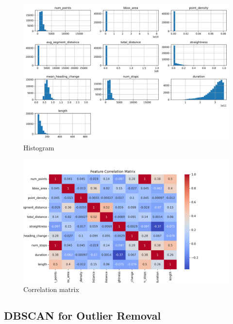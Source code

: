 \documentclass[a4paper,12pt,twoside]{scrreprt}
\begin{document}
\begin{figure}[htbp]
  \centering

  \includegraphics[width=1\textwidth]{Figures/histogram_feature_data_pre_clustering.png}
  \caption{Histogram}
  \label{fig:histogram-feature-engineered-data}
\end{figure}
\FloatBarrier

\begin{figure}[htbp]
  \centering

  \includegraphics[width=1\textwidth]{Figures/correlation_matrix_pre_clustering.png}
  \caption{Correlation matrix}
  \label{fig:correlation-matrix}
\end{figure}
\FloatBarrier

\subsection{DBSCAN for Outlier Removal}
\end{document}
